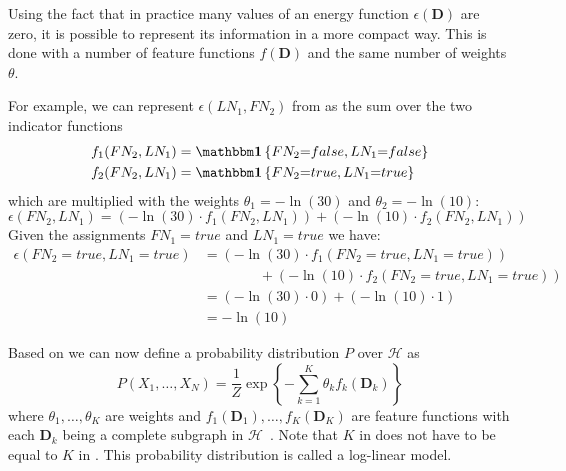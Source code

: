 \bigskip

Using the fact that in practice many values of an \gls{energy function} $\epsilon(\mathbf{D})$ are zero, it is possible to represent its information in a more compact way.
This is done with a number of \glspl{feature function} $f(\mathbf{D})$ and the same number of weights $\theta$.

For example, we can represent $\epsilon(LN_1,FN_2)$ from  as the sum over the two indicator functions
\begin{equation*}
  \begin{split}
    f_1(FN_2,LN_1)&=\identityfun\left\{FN_2{=}false,LN_1{=}false\right\}\\
    f_2(FN_2,LN_1)&=\identityfun\left\{FN_2{=}true,LN_1{=}true\right\}
  \end{split}
\end{equation*}
which are multiplied with the weights $\theta_1{=}-\ln(30)$ and $\theta_2{=}-\ln(10)$:
\begin{equation*}
  \epsilon\left(FN_2,LN_1\right)=\left(-\ln(30)\cdot f_1(FN_2,LN_1)\right)+\left(-\ln(10)\cdot f_2(FN_2,LN_1)\right)
\end{equation*}
Given the assignments $FN_1{=}true$ and $LN_1{=}true$ we have:
\begin{equation*}
  \begin{split}
  \epsilon\left(FN_2{=}true,LN_1{=}true\right)&=\left(-\ln(30)\cdot f_1(FN_2{=}true,LN_1{=}true)\right)\\
  &\hspace{4em}+\left(-\ln(10)\cdot f_2(FN_2{=}true,LN_1{=}true)\right)\\
  &=\left(-\ln(30)\cdot 0\right)+\left(-\ln(10)\cdot 1\right)\\
  &=-\ln(10)
  \end{split}
\end{equation*}



\bigskip

Based on  we can now define a \gls{probability distribution} $P$ over $\mathcal{H}$ as
\begin{equation}
  \label{equ:log-linear-model}
  P\left(X_1,\dots,X_N\right) = \frac{1}{Z}\exp\left\{-\sum_{k=1}^K \theta_k f_k\left(\mathbf{D}_k\right)\right\}
\end{equation}
where $\theta_1,\dots,\theta_K$ are weights and $f_1(\mathbf{D}_1),\dots,f_K(\mathbf{D}_K)$ are \glspl{feature function} with each $\mathbf{D}_k$ being a complete subgraph in $\mathcal{H}$~\citep{koller2009probabilistic}.
Note that $K$ in  does not have to be equal to $K$ in .
This \gls{probability distribution} is called a \gls{log-linear model}.

